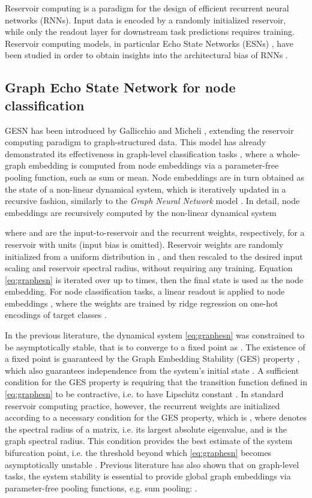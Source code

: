 \documentclass[final,5p,times,twocolumn]{elsarticle}
\begin{document}
Reservoir computing \citep{Nakajima2021,Lukosevicius2009,Verstraeten2007} is a paradigm for the design of efficient recurrent neural networks (RNNs).
Input data is encoded by a randomly initialized reservoir, while only the readout layer for downstream task predictions requires training.
Reservoir computing models, in particular Echo State Networks (ESNs) \citep{Jaeger2004}, have been studied in order to obtain insights into the architectural bias of RNNs \citep{Hammer2003,Gallicchio2011}.

\subsection{Graph Echo State Network for node classification}

GESN has been introduced by Gallicchio and Micheli \cite{Gallicchio2010}, extending the reservoir computing paradigm to graph-structured data.
This model has already demonstrated its effectiveness in graph-level classification tasks \citep{Gallicchio2020}, where a whole-graph embedding is computed from node embeddings via a parameter-free pooling function, such as sum or mean.
Node embeddings are in turn obtained as the state of a non-linear dynamical system, which is iteratively updated in a recursive fashion, similarly to the \textsl{Graph Neural Network} model \cite{Scarselli2009}.
In detail, node embeddings  are recursively computed by the non-linear dynamical system

where  and  are the input-to-reservoir and the recurrent weights, respectively, for a reservoir with  units (input bias is omitted).
Reservoir weights are randomly initialized from a uniform distribution in , and then rescaled to the desired input scaling and reservoir spectral radius, without requiring any training.
Equation \eqref{eq:graphesn} is iterated over  up to  times, then the final state  is used as the node embedding.
For node classification tasks, a linear readout is applied to node embeddings , where the weights  are trained by ridge regression on one-hot encodings of target classes .

In the previous literature, the dynamical system \eqref{eq:graphesn} was constrained to be asymptotically stable, that is to converge to a fixed point  as .
The existence of a fixed point is guaranteed by the Graph Embedding Stability (GES) property \cite{Gallicchio2020}, which also guarantees independence from the system's initial state .
A sufficient condition for the GES property is requiring that the transition function defined in \eqref{eq:graphesn} to be contractive, i.e. to have Lipschitz constant .
In standard reservoir computing practice, however, the recurrent weights are initialized according to a necessary condition \cite{Tortorella2022} for the GES property, which is , where  denotes the spectral radius of a matrix, i.e. its largest absolute eigenvalue, and  is the graph spectral radius.
This condition provides the best estimate of the system bifurcation point, i.e. the threshold beyond which \eqref{eq:graphesn} becomes asymptotically unstable \citep{Tortorella2022}.
Previous literature has also shown that on graph-level tasks, the system stability is essential to provide global graph embeddings  via parameter-free pooling functions, e.g. sum pooling: .
\end{document}
